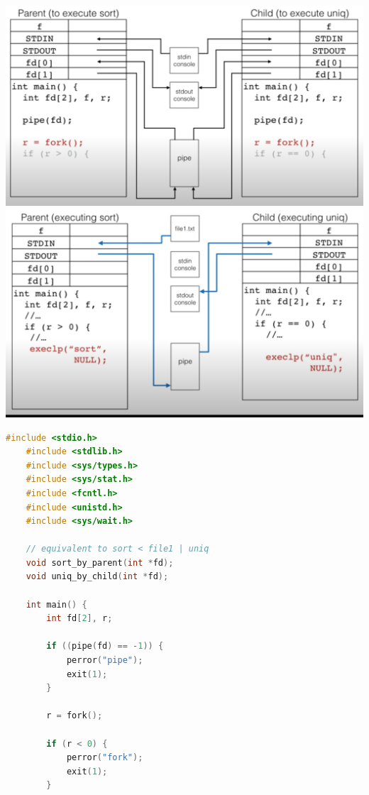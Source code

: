 \documentclass[12pt]{article}
\begin{document}
\begin{itemize}
\begin{itemize}
\begin{itemize}
            \begin{center}
            \includegraphics[width=\linewidth]{images/week_11_notes_1_1.png}
            \includegraphics[width=\linewidth]{images/week_11_notes_1_2.png}
            \end{center}
        \end{itemize}

    \begin{lstlisting}[language=c, caption={pipe\_example\_1.c}]
    #include <stdio.h>
    #include <stdlib.h>
    #include <sys/types.h>
    #include <sys/stat.h>
    #include <fcntl.h>
    #include <unistd.h>
    #include <sys/wait.h>

    // equivalent to sort < file1 | uniq
    void sort_by_parent(int *fd);
    void uniq_by_child(int *fd);

    int main() {
        int fd[2], r;

        if ((pipe(fd) == -1)) {
            perror("pipe");
            exit(1);
        }

        r = fork();

        if (r < 0) {
            perror("fork");
            exit(1);
        }


\end{lstlisting}
\end{itemize}
\end{itemize}
\end{document}
